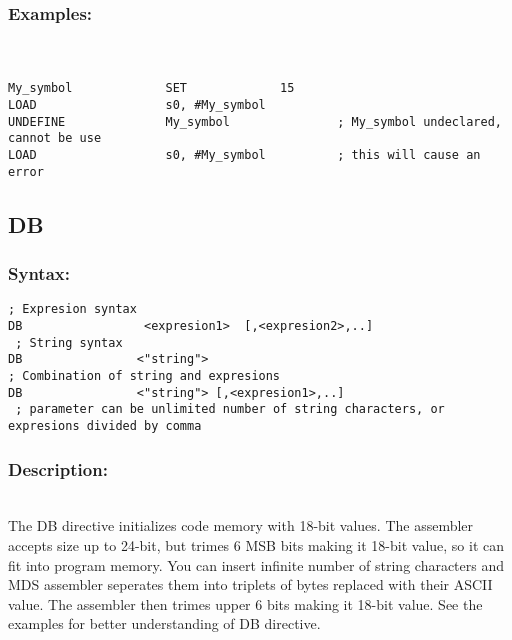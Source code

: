 {        \subsubsection{Examples:}\\
        {
            ~\\
            \usecodefont
            \verb'My_symbol             SET             15'\\
            \verb'LOAD                  s0, #My_symbol'\\
            \verb'UNDEFINE              My_symbol               ; My_symbol undeclared, cannot be use'\\
            \verb'LOAD                  s0, #My_symbol          ; this will cause an error'\\
        }

    \subsection{DB}
        \subsubsection{Syntax:}
            \verb '; Expresion syntax'\\
            \verb'DB                 <expresion1>  [,<expresion2>,..]'\\
            \verb' ; String syntax'\\
            \verb'DB                <"string">'\\
            \verb'; Combination of string and expresions'\\
            \verb'DB                <"string"> [,<expresion1>,..]'\\
            \verb' ; parameter can be unlimited number of string characters, or expresions divided by comma'\\

        \subsubsection{Description:}\\
            The DB directive initializes code memory with 18-bit values. The assembler accepts size up to 24-bit, but trimes 6 MSB bits making it 18-bit value,
            so it can fit into program memory. You can insert infinite number of string characters and MDS assembler seperates them into triplets of bytes replaced
            with their ASCII value. The assembler then trimes upper 6 bits making it 18-bit value.
            See the examples for better understanding of DB directive.

}

